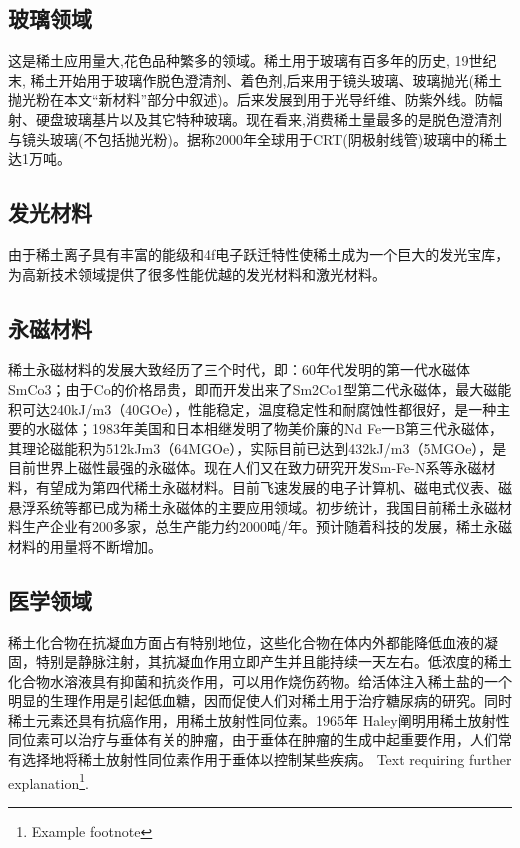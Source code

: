 \documentclass[twoside,twocolumn]{article}
\begin{document}
\subsection{玻璃领域}
这是稀土应用量大,花色品种繁多的领域。稀土用于玻璃有百多年的历史, 19世纪末, 稀土开始用于玻璃作脱色澄清剂、着色剂,后来用于镜头玻璃、玻璃抛光(稀土抛光粉在本文“新材料”部分中叙述)。后来发展到用于光导纤维、防紫外线。防幅射、硬盘玻璃基片以及其它特种玻璃。现在看来,消费稀土量最多的是脱色澄清剂与镜头玻璃(不包括抛光粉)。据称2000年全球用于CRT(阴极射线管)玻璃中的稀土达1万吨。
\subsection{发光材料}
由于稀土离子具有丰富的能级和4f电子跃迁特性使稀土成为一个巨大的发光宝库，为高新技术领域提供了很多性能优越的发光材料和激光材料。
\subsection{永磁材料}
稀土永磁材料的发展大致经历了三个时代，即：60年代发明的第一代水磁体SmCo3；由于Co的价格昂贵，即而开发出来了Sm2Co1型第二代永磁体，最大磁能积可达240kJ/m3（40GOe），性能稳定，温度稳定性和耐腐蚀性都很好，是一种主要的水磁体；1983年美国和日本相继发明了物美价廉的Nd Fe一B第三代永磁体，其理论磁能积为512kJm3（64MGOe），实际目前已达到432kJ/m3（5MGOe），是目前世界上磁性最强的永磁体。现在人们又在致力研究开发Sm-Fe-N系等永磁材料，有望成为第四代稀土永磁材料。目前飞速发展的电子计算机、磁电式仪表、磁悬浮系统等都已成为稀土永磁体的主要应用领域。初步统计，我国目前稀土永磁材料生产企业有200多家，总生产能力约2000吨/年。预计随着科技的发展，稀土永磁材料的用量将不断增加。
\subsection{医学领域}
稀土化合物在抗凝血方面占有特别地位，这些化合物在体内外都能降低血液的凝固，特别是静脉注射，其抗凝血作用立即产生并且能持续一天左右。低浓度的稀土化合物水溶液具有抑菌和抗炎作用，可以用作烧伤药物。给活体注入稀土盐的一个明显的生理作用是引起低血糖，因而促使人们对稀土用于治疗糖尿病的研究。同时稀土元素还具有抗癌作用，用稀土放射性同位素。1965年 Haley阐明用稀土放射性同位素可以治疗与垂体有关的肿瘤，由于垂体在肿瘤的生成中起重要作用，人们常有选择地将稀土放射性同位素作用于垂体以控制某些疾病。
Text requiring further explanation\footnote{Example footnote}.
\end{document}
